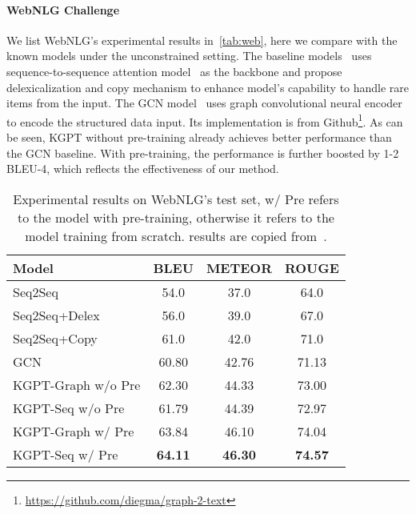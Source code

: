 \documentclass[11pt,a4paper]{article}
\newcommand{\model}{KGPT\xspace}
\begin{document}
\paragraph{WebNLG Challenge}
We list WebNLG's experimental results in~\autoref{tab:web}, here we compare with the known models under the unconstrained setting. The baseline models~\cite{shimorina2018handling} uses sequence-to-sequence attention model~\cite{luong2015effective} as the backbone and propose delexicalization and copy mechanism to enhance model's capability to handle rare items from the input. The GCN model~\cite{marcheggiani2018deep} uses graph convolutional neural encoder to encode the structured data input. Its implementation is from Github\footnote{\url{https://github.com/diegma/graph-2-text}}. As can be seen, \model without pre-training already achieves better performance than the GCN baseline. With pre-training, the performance is further boosted by 1-2 BLEU-4, which reflects the effectiveness of our method. 
\begin{table}[!thb]
\small
\begin{tabular}{lccc}
\hline
Model                & BLEU  & METEOR & ROUGE \\
\hline
Seq2Seq           & 54.0  & 37.0    & 64.0 \\
Seq2Seq+Delex   & 56.0  & 39.0    & 67.0 \\
Seq2Seq+Copy    & 61.0  & 42.0    & 71.0 \\
GCN  & 60.80  & 42.76   & 71.13 \\
\hline
\model-Graph w/o Pre   & 62.30 & 44.33  & 73.00 \\
\model-Seq w/o Pre   & 61.79 & 44.39  & 72.97 \\
\hline
\model-Graph w/ Pre    & 63.84    &   46.10    &  74.04 \\
\model-Seq w/ Pre    &  \textbf{64.11}     &   \textbf{46.30}    &  \textbf{74.57} \\
\hline
\end{tabular}
\caption{Experimental results on WebNLG's test set, w/ Pre refers to the model with pre-training, otherwise it refers to the model training from scratch.  results are copied from~\citet{shimorina2018handling}. }
\label{tab:web}
\vspace{-3ex}
\end{table}
\end{document}
